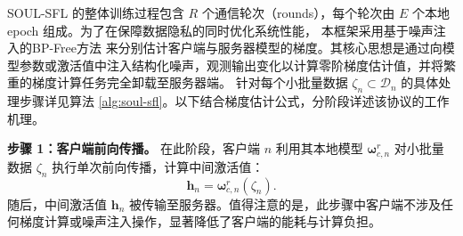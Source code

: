 SOUL-SFL 的整体训练过程包含 $R$ 个通信轮次（rounds），每个轮次由 $E$ 个本地 epoch 组成。为了在保障数据隐私的同时优化系统性能，
本框架采用基于噪声注入的BP-Free方法 \cite{jiang2023one} 来分别估计客户端与服务器模型的梯度。其核心思想是通过向模型参数或激活值中注入结构化噪声，观测输出变化以计算零阶梯度估计值，并将繁重的梯度计算任务完全卸载至服务器端。
针对每个小批量数据 $\zeta_n \subset \mathcal{D}_n$ 的具体处理步骤详见算法 \ref{alg:soul-sfl}。以下结合梯度估计公式，分阶段详述该协议的工作机理。

\textbf{步骤 1：客户端前向传播。}
在此阶段，客户端 $n$ 利用其本地模型 $\boldsymbol{\omega}_{c,n}^r$ 对小批量数据 $\zeta_n$ 执行单次前向传播，计算中间激活值：
\begin{equation}
    \mathbf{h}_n = \boldsymbol{\omega}_{c,n}^r(\zeta_n).
\end{equation}
随后，中间激活值 $\mathbf{h}_n$ 被传输至服务器。值得注意的是，此步骤中客户端不涉及任何梯度计算或噪声注入操作，显著降低了客户端的能耗与计算负担。

